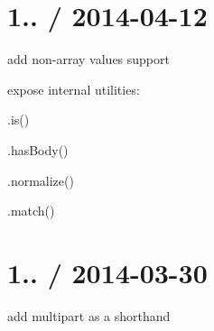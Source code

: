\section*{1.. / 2014-\/04-\/12 }


\begin{DoxyItemize}
\item add non-\/array values support
\item expose internal utilities\+:
\begin{DoxyItemize}
\item {\ttfamily .is()}
\item {\ttfamily .has\+Body()}
\item {\ttfamily .normalize()}
\item {\ttfamily .match()}
\end{DoxyItemize}
\end{DoxyItemize}

\section*{1.. / 2014-\/03-\/30 }


\begin{DoxyItemize}
\item add {\ttfamily multipart} as a shorthand 
\end{DoxyItemize}